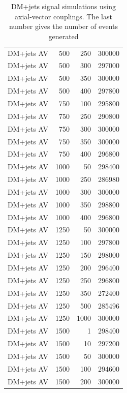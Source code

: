 \begin{table}[]
\begin{tabular}[t]{lrrr}
\hline
DM+jets AV & 500  & 250  &300000 \\
DM+jets AV & 500  & 300  &297000 \\
DM+jets AV & 500  & 350  &300000 \\
DM+jets AV & 500  & 400  &297800 \\
DM+jets AV & 750  & 100  &295800 \\
DM+jets AV & 750  & 250  &290800 \\
DM+jets AV & 750  & 300  &300000 \\
DM+jets AV & 750  & 350  &300000 \\
DM+jets AV & 750  & 400  &296800 \\
DM+jets AV & 1000 & 50   &298400 \\
DM+jets AV & 1000 & 250  &286980 \\
DM+jets AV & 1000 & 300  &300000 \\
DM+jets AV & 1000 & 350  &298800 \\
DM+jets AV & 1000 & 400  &296800 \\
DM+jets AV & 1250 & 50   &300000 \\
DM+jets AV & 1250 & 100  &297800 \\
DM+jets AV & 1250 & 150  &298000 \\
DM+jets AV & 1250 & 200  &296400 \\
DM+jets AV & 1250 & 250  &296800 \\
DM+jets AV & 1250 & 350  &272400 \\
DM+jets AV & 1250 & 500  &285496 \\
DM+jets AV & 1250 & 1000 &300000 \\
DM+jets AV & 1500 & 1    &298400 \\
DM+jets AV & 1500 & 10   &297200 \\
DM+jets AV & 1500 & 50   &300000 \\
DM+jets AV & 1500 & 100  &294600 \\
DM+jets AV & 1500 & 200  &300000\\
\hline \hline
\end{tabular}
\caption{DM+jets signal simulations using axial-vector couplings. The last number gives the number of events generated}
\label{tab:dmj_av}
\end{table}

